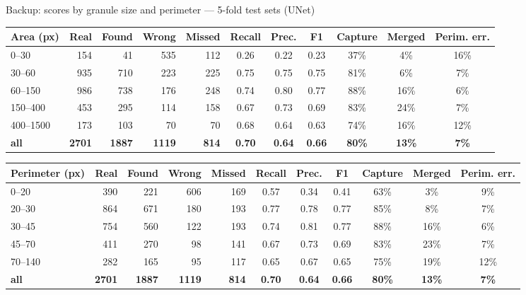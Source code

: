 \begin{frame}{Backup: scores by granule size and perimeter --- 5-fold test sets (UNet)}
  \centering\scriptsize
  \renewcommand{\arraystretch}{1.05}\setlength{\tabcolsep}{3.5pt}
\begin{tabular}{@{}lrrrrcccccc@{}}
\toprule
\textbf{Area (px)} & \textbf{Real} & \textbf{Found} & \textbf{Wrong} & \textbf{Missed} & \textbf{Recall} & \textbf{Prec.} & \textbf{F1} & \textbf{Capture} & \textbf{Merged} & \textbf{Perim. err.} \\
\midrule
0--30 & 154 & 41 & 535 & 112 & 0.26 & 0.22 & 0.23 & 37\% & 4\% & 16\% \\
30--60 & 935 & 710 & 223 & 225 & 0.75 & 0.75 & 0.75 & 81\% & 6\% & 7\% \\
60--150 & 986 & 738 & 176 & 248 & 0.74 & 0.80 & 0.77 & 88\% & 16\% & 6\% \\
150--400 & 453 & 295 & 114 & 158 & 0.67 & 0.73 & 0.69 & 83\% & 24\% & 7\% \\
400--1500 & 173 & 103 & 70 & 70 & 0.68 & 0.64 & 0.63 & 74\% & 16\% & 12\% \\
\textbf{all} & \textbf{2701} & \textbf{1887} & \textbf{1119} & \textbf{814} & \textbf{0.70} & \textbf{0.64} & \textbf{0.66} & \textbf{80\%} & \textbf{13\%} & \textbf{7\%} \\
\bottomrule
\end{tabular}

  \vspace{2mm}
\begin{tabular}{@{}lrrrrcccccc@{}}
\toprule
\textbf{Perimeter (px)} & \textbf{Real} & \textbf{Found} & \textbf{Wrong} & \textbf{Missed} & \textbf{Recall} & \textbf{Prec.} & \textbf{F1} & \textbf{Capture} & \textbf{Merged} & \textbf{Perim. err.} \\
\midrule
0--20 & 390 & 221 & 606 & 169 & 0.57 & 0.34 & 0.41 & 63\% & 3\% & 9\% \\
20--30 & 864 & 671 & 180 & 193 & 0.77 & 0.78 & 0.77 & 85\% & 8\% & 7\% \\
30--45 & 754 & 560 & 122 & 193 & 0.74 & 0.81 & 0.77 & 88\% & 16\% & 6\% \\
45--70 & 411 & 270 & 98 & 141 & 0.67 & 0.73 & 0.69 & 83\% & 23\% & 7\% \\
70--140 & 282 & 165 & 95 & 117 & 0.65 & 0.67 & 0.65 & 75\% & 19\% & 12\% \\
\textbf{all} & \textbf{2701} & \textbf{1887} & \textbf{1119} & \textbf{814} & \textbf{0.70} & \textbf{0.64} & \textbf{0.66} & \textbf{80\%} & \textbf{13\%} & \textbf{7\%} \\
\bottomrule
\end{tabular}
  \vfill
\end{frame}

